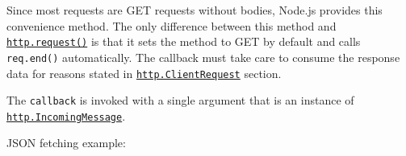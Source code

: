 Since most requests are GET requests without bodies, Node.js provides
this convenience method. The only difference between this method and
\hyperref[httprequestoptions-callback]{\texttt{http.request()}} is that
it sets the method to GET by default and calls \texttt{req.end()}
automatically. The callback must take care to consume the response data
for reasons stated in
\hyperref[class-httpclientrequest]{\texttt{http.ClientRequest}} section.

The \texttt{callback} is invoked with a single argument that is an
instance of
\hyperref[class-httpincomingmessage]{\texttt{http.IncomingMessage}}.

JSON fetching example:

\begin{Shaded}
\begin{Highlighting}[]
\NormalTok{(}\OperatorTok{,}\KeywordTok{=\textgreater{}}\NormalTok{ \{}
  \OperatorTok{=}\OperatorTok{;}
  \OperatorTok{=}\NormalTok{[}\NormalTok{]}\OperatorTok{;}

  \OperatorTok{;}
  \OperatorTok{!==} \NormalTok{) \{}
\OperatorTok{=}  \NormalTok{(}\StringTok{\textquotesingle{}} \OperatorTok{+}
                      \SpecialCharTok{$\{}\SpecialCharTok{\}}\VerbatimStringTok{\textasciigrave{}}\NormalTok{)}\OperatorTok{;}
\NormalTok{  \} } \NormalTok{ (}\OperatorTok{!}\SpecialStringTok{/}\SpecialCharTok{\^{}}\SpecialCharTok{\textbackslash{}/}
\OperatorTok{=}  \NormalTok{(}\StringTok{\textquotesingle{}} \OperatorTok{+}
                      \SpecialCharTok{$\{}\SpecialCharTok{\}}\VerbatimStringTok{\textasciigrave{}}\NormalTok{)}\OperatorTok{;}
\NormalTok{  \}}
    \NormalTok{)}\OperatorTok{;}
\NormalTok{()}\OperatorTok{;}
    \OperatorTok{;}
\NormalTok{  \}}


\end{Highlighting}
\end{Shaded}
